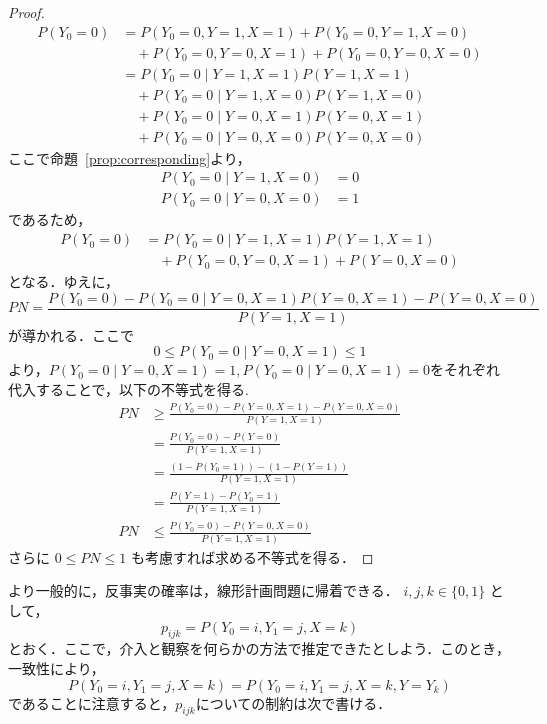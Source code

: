 \documentclass[uplatex, dvipdfmx]{jsarticle}
\begin{document}
\begin{proof}
  \begin{align}
    P(Y_0=0) &= P(Y_0=0, Y=1, X=1) + P(Y_0=0, Y=1, X=0) \\
    &\quad + P(Y_0=0, Y=0, X=1) + P(Y_0=0, Y=0, X=0) \\
    &= P(Y_0=0 \mid Y=1, X=1)P(Y=1, X=1) \\
    &\quad + P(Y_0=0 \mid Y=1, X=0)P(Y=1, X=0) \\
    &\quad + P(Y_0=0 \mid Y=0, X=1)P(Y=0, X=1) \\
    &\quad + P(Y_0=0 \mid Y=0, X=0)P(Y=0, X=0)
  \end{align}
  ここで命題~\ref{prop:corresponding}より，
  \begin{align}
    P(Y_0=0 \mid Y=1, X=0) &= 0 \\
    P(Y_0=0 \mid Y=0, X=0) &= 1
  \end{align}
  であるため，
  \begin{align}
    P(Y_0=0) &= P(Y_0=0 \mid Y=1, X=1)P(Y=1, X=1) \\
    &\quad + P(Y_0=0, Y=0, X=1) + P(Y=0, X=0)
  \end{align}
  となる．ゆえに，
  \begin{equation}
    PN = \frac{P(Y_0=0) - P(Y_0=0 \mid Y=0, X=1)P(Y=0, X=1) - P(Y=0, X=0)}{P(Y=1, X=1)}
  \end{equation}
  が導かれる．ここで
  \begin{equation}
    0 \leq P(Y_0=0 \mid Y=0, X=1) \leq 1
  \end{equation}
  より，$P(Y_0=0 \mid Y=0, X=1)=1, P(Y_0=0 \mid Y=0, X=1)=0$をそれぞれ代入することで，以下の不等式を得る.
  \begin{align}
    PN &\geq \frac{P(Y_0=0) - P(Y=0, X=1) - P(Y=0, X=0)}{P(Y=1, X=1)} \\
    &= \frac{P(Y_0=0) - P(Y=0)}{P(Y=1, X=1)} \\
    &= \frac{(1 - P(Y_0=1)) - (1 - P(Y=1))}{P(Y=1, X=1)} \\
    &= \frac{P(Y=1) - P(Y_0=1)}{P(Y=1, X=1)} \\
    PN &\leq \frac{P(Y_0=0) - P(Y=0, X=0)}{P(Y=1, X=1)}
  \end{align}
  さらに $0 \leq PN \leq 1$ も考慮すれば求める不等式を得る．
\end{proof}

より一般的に，反事実の確率は，線形計画問題に帰着できる．
$i, j, k \in \{0, 1\}$ として，
\begin{equation}
  p_{ijk} = P(Y_0=i, Y_1=j, X=k)
\end{equation}
とおく．ここで，介入と観察を何らかの方法で推定できたとしよう．このとき，一致性により，
\begin{equation}
  P(Y_0=i, Y_1=j, X=k) = P(Y_0=i, Y_1=j, X=k, Y=Y_k)
\end{equation}
であることに注意すると，$p_{ijk}$についての制約は次で書ける．
\end{document}

